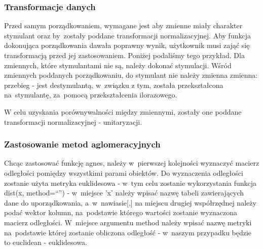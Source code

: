 \documentclass[12pt,a4paper]{report}
\begin{document}
{\subsubsection{Transformacje danych}\label{transformacje-danych}

Przed samym porządkowaniem, wymagane jest aby zmienne miały charakter
stymulant oraz by~zostały poddane transformacji normalizacyjnej. Aby
funkcja dokonująca porządkowania dawała poprawny wynik, użytkownik musi
zająć się transformacją przed jej zastosowaniem. Poniżej podaliśmy tego
przykład. Dla zmiennych, które stymulantami nie są, należy dokonać
stymulacji. Wśród zmiennych poddanych porządkowaniu, do stymulant
nie należy zmienna zmienna: przebieg - jest destymulantą, w~związku z
tym, została przekształcona na~stymulantę, za~pomocą przekształcenia
ilorazowego.


\begin{Shaded}
\begin{Highlighting}[]
\NormalTok{)}
\end{Highlighting}
\end{Shaded}

W celu uzyskania porównywalności między zmiennymi, zostały one poddane
transformacji normalizacyjnej - unitaryzacji.

\begin{Shaded}
\begin{Highlighting}[]
\end{Highlighting}
\end{Shaded}

\subsubsection{Zastosowanie metod aglomeracyjnych}


Chcąc zastosować funkcję agnes, należy w~pierwszej kolejności wyznaczyć
macierz odległości pomiędzy wszystkimi parami obiektów. Do wyznaczenia
odległości zostanie użyta metryka euklidesowa - w~tym celu zostanie
wykorzystania funkcja dist(x, method=``'') - w~miejsce 'x' należy wpisać
nazwę tabeli zawierających dane do uporządkowania, a~w~nawiasie{[},{]}
na miejscu drugiej współrzędnej należy podać wektor kolumn, na~podstawie
którego wartości zostanie wyznaczona macierz odległości. W~miejsce
argumentu method należy wpisać nazwę metryki na~podstawie której zostanie
obliczona odległość - w~naszym przypadku będzie to euclidean -
euklidesowa.

}
\end{document}
